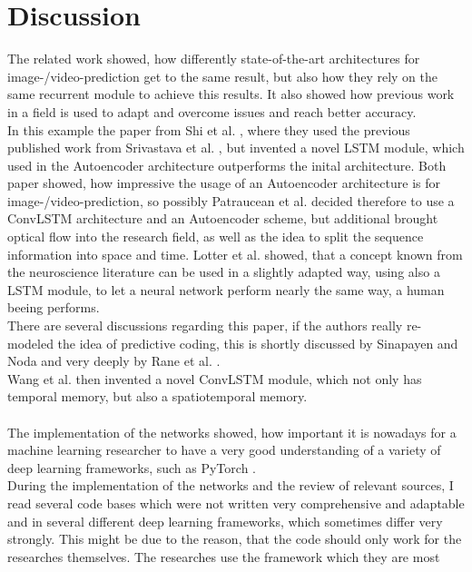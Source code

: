 \section{Discussion} \label{section::discussion}
 The related work showed, how differently state-of-the-art architectures for image-/video-prediction get to the same result, but also how they rely on the same
 recurrent module to achieve this results. It also showed how previous work in a field is used to adapt and overcome issues and reach better accuracy.\\
 In this example the paper from Shi et al. \cite{Shi2015}, where they used the previous published work from Srivastava et al. \cite{Srivastava2015}, but invented 
 a novel LSTM module, which used in the Autoencoder architecture outperforms the inital architecture. Both paper showed, how impressive the usage of an 
 Autoencoder architecture is for image-/video-prediction, so possibly Patraucean et al. \cite{Patraucean2015} decided therefore to use a ConvLSTM architecture and 
 an Autoencoder scheme, but additional brought optical flow into the research field, as well as the idea to split the sequence information into space and time. 
 Lotter et al. \cite{Lotter2016} showed, that a concept known from the neuroscience literature can be used in a slightly adapted way,
 using also a LSTM module, to let a neural network perform nearly the same way, a human beeing performs.\\There are several discussions regarding this paper, if
 the authors really re-modeled the idea of predictive coding, this is shortly discussed by Sinapayen and Noda \cite{Sinapayen2019} and very deeply by Rane et al. 
 \cite{Rane2019}.\\
 Wang et al. \cite{Wang2017} then invented a novel ConvLSTM module, which not only has temporal memory, but also a spatiotemporal memory.
 \\\\
 The implementation of the networks showed, how important it is nowadays for a machine learning researcher to have a very good understanding of a variety of deep 
 learning frameworks, such as PyTorch \cite{Paszke2019}.\\During the implementation of the networks and the review of relevant sources,
 I read several code bases which
 were not written very comprehensive and adaptable and in several different deep learning frameworks, which sometimes differ very strongly.
 This might be due to the reason, that the code should only work for the researches themselves. The researches use the framework which they are most
